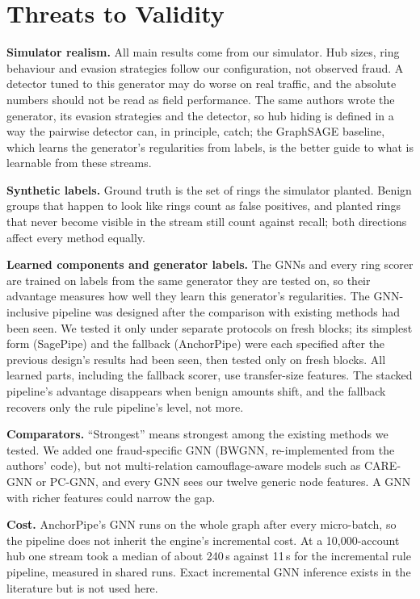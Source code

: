


\section{Threats to Validity}
\label{sec:threats}
\textbf{Simulator realism.} All main results come from our simulator. Hub
sizes, ring behaviour and evasion strategies follow our configuration, not
observed fraud. A detector tuned to this generator may do worse on real
traffic, and the absolute numbers should not be read as field performance. The
same authors wrote the generator, its evasion strategies and the detector, so
hub hiding is defined in a way the pairwise detector can, in principle, catch;
the GraphSAGE baseline, which learns the generator's regularities from labels,
is the better guide to what is learnable from these streams.

\textbf{Synthetic labels.} Ground truth is the set of rings the simulator
planted. Benign groups that happen to look like rings count as false
positives, and planted rings that never become visible in the stream still
count against recall; both directions affect every method equally.

\textbf{Learned components and generator labels.} The GNNs and every ring
scorer are trained on labels from the same generator they are tested on, so
their advantage measures how well they learn this generator's regularities.
The GNN-inclusive pipeline was designed after the comparison with existing
methods had been seen. We tested it only under separate protocols on fresh
blocks; its simplest form (SagePipe) and the fallback (AnchorPipe) were each
specified after the previous design's results had been seen, then tested only on
fresh blocks. All learned parts, including the fallback scorer, use transfer-size
features. The stacked pipeline's advantage disappears when benign amounts shift,
and the fallback recovers only the rule pipeline's level, not more.

\textbf{Comparators.} ``Strongest'' means strongest among the existing methods we tested.
We added one fraud-specific GNN (BWGNN, re-implemented from the authors' code), but
not multi-relation camouflage-aware models such as CARE-GNN or PC-GNN, and every
GNN sees our twelve generic node features. A GNN with richer features could
narrow the gap.

\textbf{Cost.} AnchorPipe's GNN runs on the whole graph after every micro-batch,
so the pipeline does not inherit the engine's incremental cost. At a
10{,}000-account hub one stream took a median of about 240\,s against 11\,s for
the incremental rule pipeline, measured in shared runs. Exact incremental GNN
inference exists in the literature but is not used here.

